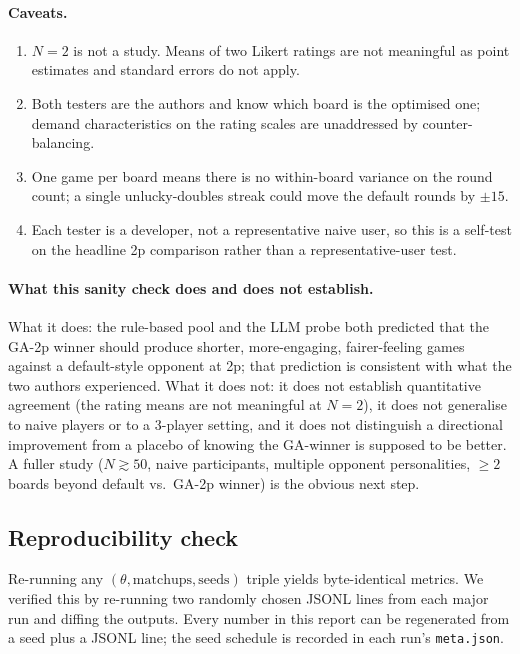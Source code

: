 \documentclass[10pt]{article}
\begin{document}
\paragraph{Caveats.}
\begin{enumerate}[leftmargin=1.4em,itemsep=1pt]
\item $N{=}2$ is not a study. Means of two Likert ratings are not
  meaningful as point estimates and standard errors do not apply.
\item Both testers are the authors and know which board is the
  optimised one; demand characteristics on the rating scales are
  unaddressed by counter-balancing.
\item One game per board means there is no within-board variance
  on the round count; a single unlucky-doubles streak could move
  the default rounds by $\pm 15$.
\item Each tester is a developer, not a representative naive
  user, so this is a self-test on the headline 2p comparison
  rather than a representative-user test.
\end{enumerate}

\paragraph{What this sanity check does and does not establish.}
What it does: the rule-based pool and the LLM probe both predicted
that the GA-2p winner should produce shorter, more-engaging,
fairer-feeling games against a default-style opponent at 2p; that
prediction is consistent with what the two authors experienced.
What it does not: it does not establish quantitative agreement
(the rating means are not meaningful at $N{=}2$), it does not
generalise to naive players or to a 3-player setting, and it does
not distinguish a directional improvement from a placebo of
knowing the GA-winner is supposed to be better. A fuller study
($N \gtrsim 50$, naive participants, multiple opponent
personalities, $\geq 2$ boards beyond default vs.\ GA-2p winner)
is the obvious next step.

\subsection{Reproducibility check}\label{sec:repro}

Re-running any $(\theta, \text{matchups}, \text{seeds})$ triple yields
byte-identical metrics. We verified this by re-running two randomly
chosen JSONL lines from each major run and diffing the outputs. Every
number in this report can be regenerated from a seed plus a JSONL
line; the seed schedule is recorded in each run's
\texttt{meta.json}.
\end{document}
